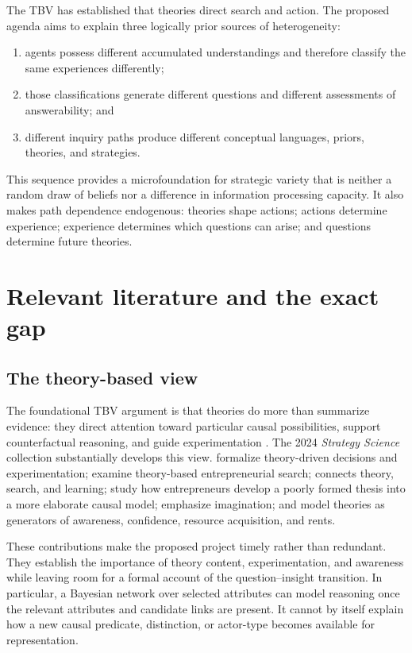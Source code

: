 \documentclass[11pt]{article}
\begin{document}
	The TBV has established that theories direct search and action.  The proposed agenda aims to explain three logically prior sources of heterogeneity:
	\begin{enumerate}
		\item agents possess different accumulated understandings and therefore classify the same experiences differently;
		\item those classifications generate different questions and different assessments of answerability; and
		\item different inquiry paths produce different conceptual languages, priors, theories, and strategies.
	\end{enumerate}
	This sequence provides a microfoundation for strategic variety that is neither a random draw of beliefs nor a difference in information processing capacity.  It also makes path dependence endogenous: theories shape actions; actions determine experience; experience determines which questions can arise; and questions determine future theories.
	
	\section{Relevant literature and the exact gap}
	
	\subsection{The theory-based view}
	
	The foundational TBV argument is that theories do more than summarize evidence: they direct attention toward particular causal possibilities, support counterfactual reasoning, and guide experimentation \citep{FelinZenger2017}.  The 2024 \emph{Strategy Science} collection substantially develops this view.  \citet{CamuffoEtAl2024} formalize theory-driven decisions and experimentation; \citet{ChavdaGansStern2024} examine theory-based entrepreneurial search; \citet{Sorenson2024} connects theory, search, and learning; \citet{OttHannah2024} study how entrepreneurs develop a poorly formed thesis into a more elaborate causal model; \citet{RindovaMartins2024} emphasize imagination; and \citet{EhrigZenger2024} model theories as generators of awareness, confidence, resource acquisition, and rents.
	
	These contributions make the proposed project timely rather than redundant.  They establish the importance of theory content, experimentation, and awareness while leaving room for a formal account of the question--insight transition.  In particular, a Bayesian network over selected attributes can model reasoning once the relevant attributes and candidate links are present.  It cannot by itself explain how a new causal predicate, distinction, or actor-type becomes available for representation.
	
\end{document}
